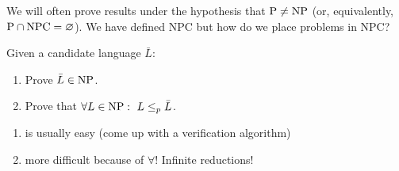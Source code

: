 We will often prove results under the hypothesis that $\mathrm{P}\neq\mathrm{NP}$ (or, equivalently, $\mathrm{P}\cap\mathrm{NPC}=\varnothing$).
We have defined NPC but how do we place problems in NPC?

Given a candidate language $\bar L$:
\begin{enumerate}
\item Prove $\bar L\in\mathrm{NP}$.
\item Prove that $\forall L\in\classNP:\ L\polyred\bar L$.
\end{enumerate}

\begin{enumerate}
    \item is usually easy (come up with a verification algorithm) 
    \item more difficult because of $\forall$! Infinite reductions!
\end{enumerate}


